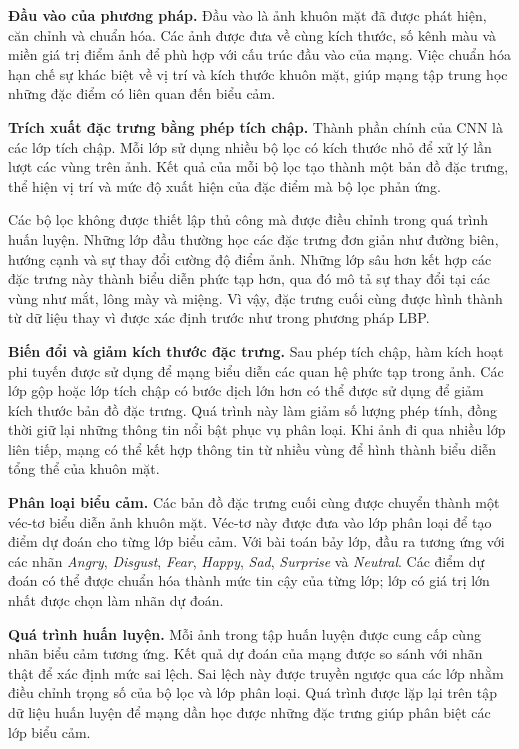 \documentclass[../LuanVan.tex]{subfiles}
\begin{document}
\noindent\textbf{Đầu vào của phương pháp.} Đầu vào là ảnh khuôn mặt đã được phát hiện, căn chỉnh và chuẩn hóa. Các ảnh được đưa về cùng kích thước, số kênh màu và miền giá trị điểm ảnh để phù hợp với cấu trúc đầu vào của mạng. Việc chuẩn hóa hạn chế sự khác biệt về vị trí và kích thước khuôn mặt, giúp mạng tập trung học những đặc điểm có liên quan đến biểu cảm.

\noindent\textbf{Trích xuất đặc trưng bằng phép tích chập.} Thành phần chính của CNN là các lớp tích chập. Mỗi lớp sử dụng nhiều bộ lọc có kích thước nhỏ để xử lý lần lượt các vùng trên ảnh. Kết quả của mỗi bộ lọc tạo thành một bản đồ đặc trưng, thể hiện vị trí và mức độ xuất hiện của đặc điểm mà bộ lọc phản ứng.

Các bộ lọc không được thiết lập thủ công mà được điều chỉnh trong quá trình huấn luyện. Những lớp đầu thường học các đặc trưng đơn giản như đường biên, hướng cạnh và sự thay đổi cường độ điểm ảnh. Những lớp sâu hơn kết hợp các đặc trưng này thành biểu diễn phức tạp hơn, qua đó mô tả sự thay đổi tại các vùng như mắt, lông mày và miệng. Vì vậy, đặc trưng cuối cùng được hình thành từ dữ liệu thay vì được xác định trước như trong phương pháp LBP.

\noindent\textbf{Biến đổi và giảm kích thước đặc trưng.} Sau phép tích chập, hàm kích hoạt phi tuyến được sử dụng để mạng biểu diễn các quan hệ phức tạp trong ảnh. Các lớp gộp hoặc lớp tích chập có bước dịch lớn hơn có thể được sử dụng để giảm kích thước bản đồ đặc trưng. Quá trình này làm giảm số lượng phép tính, đồng thời giữ lại những thông tin nổi bật phục vụ phân loại. Khi ảnh đi qua nhiều lớp liên tiếp, mạng có thể kết hợp thông tin từ nhiều vùng để hình thành biểu diễn tổng thể của khuôn mặt.

\noindent\textbf{Phân loại biểu cảm.} Các bản đồ đặc trưng cuối cùng được chuyển thành một véc-tơ biểu diễn ảnh khuôn mặt. Véc-tơ này được đưa vào lớp phân loại để tạo điểm dự đoán cho từng lớp biểu cảm. Với bài toán bảy lớp, đầu ra tương ứng với các nhãn \textit{Angry}, \textit{Disgust}, \textit{Fear}, \textit{Happy}, \textit{Sad}, \textit{Surprise} và \textit{Neutral}. Các điểm dự đoán có thể được chuẩn hóa thành mức tin cậy của từng lớp; lớp có giá trị lớn nhất được chọn làm nhãn dự đoán.

\noindent\textbf{Quá trình huấn luyện.} Mỗi ảnh trong tập huấn luyện được cung cấp cùng nhãn biểu cảm tương ứng. Kết quả dự đoán của mạng được so sánh với nhãn thật để xác định mức sai lệch. Sai lệch này được truyền ngược qua các lớp nhằm điều chỉnh trọng số của bộ lọc và lớp phân loại. Quá trình được lặp lại trên tập dữ liệu huấn luyện để mạng dần học được những đặc trưng giúp phân biệt các lớp biểu cảm.
\end{document}
